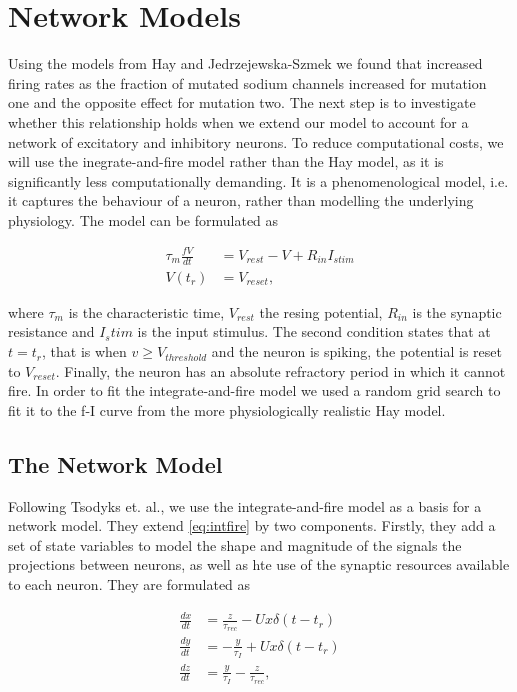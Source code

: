 \section{Network Models}

Using the models from Hay and Jedrzejewska-Szmek we found that increased firing rates as the
fraction of mutated sodium channels increased for mutation one and the opposite effect for mutation
two. The next step is to investigate whether this relationship holds when we extend our model to
account for a network of excitatory and inhibitory neurons. To reduce computational costs, we will
use the inegrate-and-fire model rather than the Hay model, as it is significantly less
computationally demanding. It is a phenomenological model, i.e. it captures the behaviour of a
neuron, rather than modelling the underlying physiology. The model can be formulated as

\begin{align} \label{eq:intfire}
    \tau_m \frac{fV}{dt} &= V_{rest} - V + R_{in}I_{stim} \\
    V(t_r) &= V_{reset},
\end{align}

where \(\tau_m\) is the characteristic time, \(V_{rest}\) the resing potential, \(R_{in}\) is the
synaptic resistance and \(I_stim\) is the input stimulus. The second condition states that at 
\(t = t_r\), that is when \(v \geq V_{threshold}\) and the neuron is spiking, the potential is reset
to \(V_{reset}\). Finally, the neuron has an absolute refractory period in which it cannot fire. In
order to fit the integrate-and-fire model we used a random grid search to fit it to the f-I curve
from the more physiologically realistic Hay model.

\subsection{The Network Model}
Following Tsodyks et. al., we use the integrate-and-fire model as a basis for a network model. They
extend \cref{eq:intfire} by two components. Firstly, they add a set of state variables to model the
shape and magnitude of the signals the projections between neurons, as well as hte use of the
synaptic resources available to each neuron. They are formulated as

\begin{align} \label{eq:state}
    \frac{dx}{dt} &= \frac{z}{\tau_{rec}} - Ux\delta(t - t_r) \\      %
    \frac{dy}{dt} &= -\frac{y}{\tau_I} + Ux\delta(t - t_r) \\
    \frac{dz}{dt} &= \frac{y}{\tau_I} - \frac{z}{\tau_{rec}},
\end{align}


